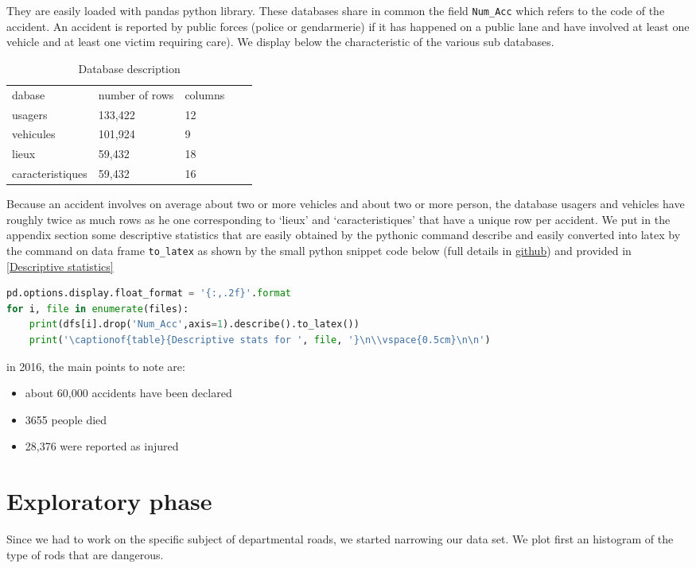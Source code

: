 \documentclass[a4paper]{article}
\theoremstyle{definition}
\theoremstyle{proposition}
\begin{document}
They are easily loaded with pandas python library. These databases share in common the field \verb |Num_Acc| which refers to the code of the accident. An accident is reported by public forces (police or gendarmerie) if it has happened on a public lane and have involved at least one vehicle and at least one victim requiring care). We display below the characteristic of the various sub databases.
\begin{table}[H]
\centering
\caption{Database description}
\label{db_description}
\begin{tabular}{lllll}
dabase 		& number of rows & columns \\
usagers  		& 133,422 	& 12 \\
vehicules 		& 101,924	&  9 \\
lieux			&  59,432	& 18 \\
caracteristiques	&  59,432	& 16 
\end{tabular}
\end{table}

Because an accident involves on average about two or more vehicles and about two or more person, the database usagers and vehicles have roughly twice as much rows as he one corresponding to `lieux' and `caracteristiques' that have a unique row per accident. We put in the appendix section some descriptive statistics that are easily obtained by the pythonic command describe and easily converted into latex by the command on data frame \verb|to_latex| as shown by the small python snippet code below (full details in \href{https://github.com/ericbenhamou/MASH_IPJ_2018}{github}) and provided in \ref{Descriptive statistics}

\begin{lstlisting}[language=Python]
pd.options.display.float_format = '{:,.2f}'.format
for i, file in enumerate(files):
    print(dfs[i].drop('Num_Acc',axis=1).describe().to_latex())
    print('\captionof{table}{Descriptive stats for ', file, '}\n\\vspace{0.5cm}\n\n')
\end{lstlisting}
\bigskip

in 2016, the main points to note are:
\begin{itemize}
\item about 60,000 accidents have been declared
\item 3655 people died
\item 28,376 were reported as injured
\end{itemize}

\section{Exploratory phase}
Since we had to work on the specific subject of departmental roads, we started narrowing our data set. We plot first an histogram of the type of rods that are dangerous. 
\end{document}
